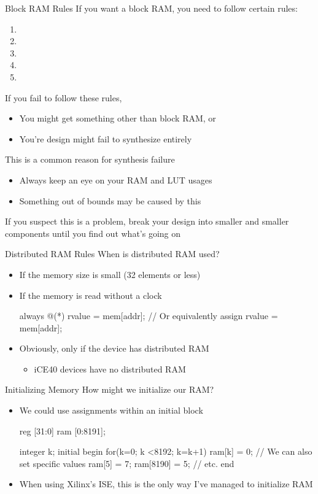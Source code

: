 \documentclass[style=gt,mode=present,paper=screen]{powerdot}
\begin{document}
\begin{slide}[bm=,toc=,method=file]{Block RAM Rules}
If you want a block RAM, you need to follow certain rules:
\begin{enumerate}
\item {}
\item {}
\item {}
\item {}
\item {}
\end{enumerate}
If you fail to follow these rules,
\begin{itemize}
\item[] You might get something other than block RAM, or
\item[] You're design might fail to synthesize entirely
\end{itemize}
This is a common reason for synthesis failure
\pause
\begin{itemize}
\item Always keep an eye on your RAM and LUT usages
\item Something out of bounds may be caused by this
\end{itemize}
If you suspect this is a problem, break your design into smaller and smaller
components until you find out what's going on 
\end{slide}
%
%
\begin{slide}[bm=,toc=,method=direct]{Distributed RAM Rules}
When is distributed RAM used?
\begin{itemize}
\item If the memory size is small (32 elements or less)
\item If the memory is read without a clock
\begin{zformal}
always @(*)
	rvalue = mem[addr];
// Or equivalently
assign	rvalue = mem[addr];
\end{zformal}
\item Obviously, only if the device has distributed RAM
	\begin{itemize}
	\item iCE40 devices have no distributed RAM
	\end{itemize}
\end{itemize}
\end{slide}
%
%
\begin{slide}[method=direct]{Initializing Memory}
How might we initialize our RAM?
\begin{itemize}
\item We could  use assignments within an initial block
\begin{zformal}
reg [31:0]	ram	[0:8191];

integer	k;
initial	begin
	for(k=0; k <8192; k=k+1)
		ram[k] = 0;
	// We can also set specific values
	ram[5] = 7;
	ram[8190] = 5;
	// etc.
end
\end{zformal}
\item When using Xilinx's ISE, this is the only way I've managed
	to initialize RAM
\end{itemize}
\end{slide}
\end{document}
